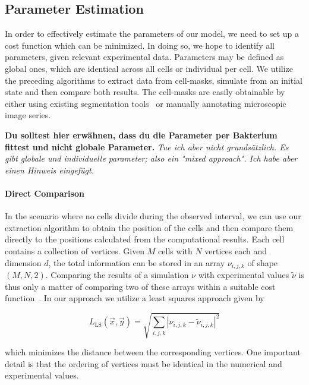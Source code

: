 \documentclass[10pt,letterpaper]{article}
\begin{document}
\subsection{Parameter Estimation}
\label{section:parameter-estimation}
In order to effectively estimate the parameters of our model, we need to set up a cost function
which can be minimized.
In doing so, we hope to identify all parameters, given relevant experimental data.
Parameters may be defined as global ones, which are identical across all cells or individual per
cell.
We utilize the preceding algorithms to extract data from cell-masks, simulate from an initial state
and then compare both results.
The cell-masks are easily obtainable by either using existing segmentation
tools~\cite{Cutler2022,Stringer2020,Hardo2022} or manually annotating microscopic image series.

\textbf{Du solltest hier erwähnen, dass du die Parameter per Bakterium fittest und nicht globale Parameter.}
\textit{Tue ich aber nicht grundsätzlich. Es gibt globale und individuelle parameter; also ein "mixed approach". Ich habe aber einen Hinweis eingefügt.}

\paragraph{Direct Comparison}
In the scenario where no cells divide during the observed interval, we can use our extraction
algorithm to obtain the position of the cells and then compare them directly to the positions
calculated from the computational results.
Each cell contains a collection of vertices.
Given $M$ cells with $N$ vertices each and dimension $d$, the total information can be stored in an
array $\nu_{i,j,k}$ of shape $(M,N,2)$.
Comparing the results of a simulation $\nu$ with experimental values $\tilde{\nu}$ is thus only a
matter of comparing two of these arrays within a suitable cost function~\cite{Wang2020}.
In our approach we utilize a least squares approach given by

\begin{equation}
    L_{\text{LS}}(\vec{x}, \vec{y})
        = \sqrt{\sum\limits_{i,j,k}|\nu_{i,j,k} - \tilde{\nu}_{i,j,k}|^2}
\end{equation}

which minimizes the distance between the corresponding vertices.
One important detail is that the ordering of vertices must be identical in the numerical and
experimental values.
\end{document}
